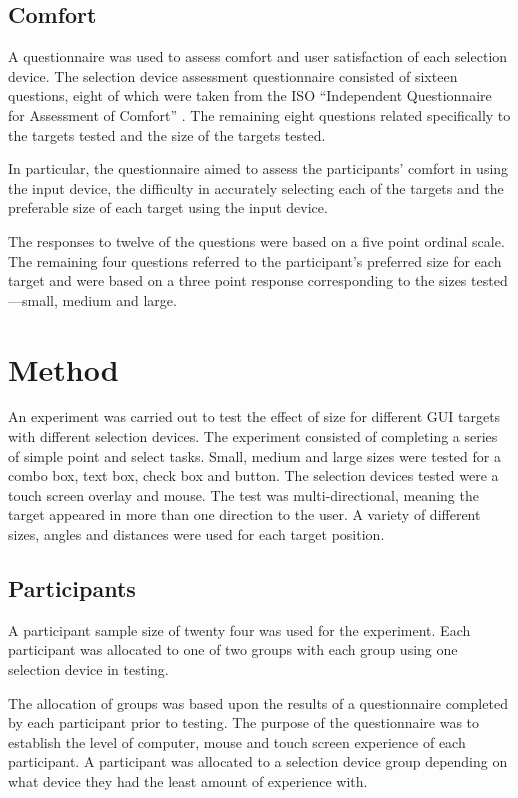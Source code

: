 \documentclass{elsart}
\begin{document}
\subsection{Comfort}
\label{sec-evaluation-comfort}

A questionnaire was used to assess comfort and user satisfaction of each
selection device. The selection device assessment questionnaire
consisted of sixteen questions, eight of which were taken from the ISO
``Independent Questionnaire for Assessment of Comfort''
\citep{Doug-SA-1999-CHI}. The remaining eight questions related
specifically to the targets tested and the size of the targets tested.

In particular, the questionnaire aimed to assess the participants'
comfort in using the input device, the difficulty in accurately
selecting each of the targets and the preferable size of each target
using the input device.

The responses to twelve of the questions were based on a five point
ordinal scale. The remaining four questions referred to the
participant's preferred size for each target and were based on a three
point response corresponding to the sizes tested---small, medium and
large.

\section{Method}
\label{sec-method}

An experiment was carried out to test the effect of size for different
GUI targets with different selection devices. The experiment consisted
of completing a series of simple point and select tasks. Small, medium
and large sizes were tested for a combo box, text box, check box and
button. The selection devices tested were a touch screen overlay and
mouse. The test was multi-directional, meaning the target appeared in
more than one direction to the user. A variety of different sizes,
angles and distances were used for each target position.

\subsection{Participants}
\label{sec-method-participants}

A participant sample size of twenty four was used for the experiment.
Each participant was allocated to one of two groups with each group
using one selection device in testing.

The allocation of groups was based upon the results of a questionnaire
completed by each participant prior to testing. The purpose of the
questionnaire was to establish the level of computer, mouse and touch
screen experience of each participant. A participant was allocated to a
selection device group depending on what device they had the least
amount of experience with.
\end{document}
